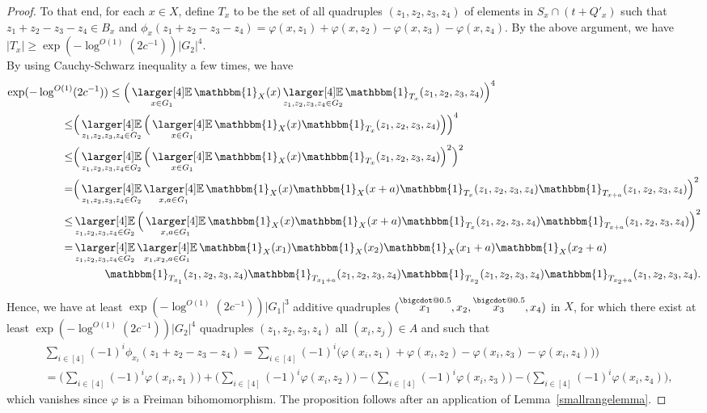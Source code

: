 \documentclass[a4paper,11pt]{article}
\makeatletter
\numberwithin{theorem}{section}
\theoremstyle{definition}
\newcommand\id{\mathbbm{1}}
\newcommand{\exx}{
  \mathop{
    \mathchoice{\vcenter{\hbox{\larger[4]$\mathbb{E}$}}}
               {\kern0pt\mathbb{E}}
               {\kern0pt\mathbb{E}}
               {\kern0pt\mathbb{E}}
  }\displaylimits
}
\newcommand*\bcdot{\mathpalette\bigcdot@{0.5}}
\newcommand*\bigcdot@[2]{\mathbin{\vcenter{\hbox{\scalebox{#2}{$\m@th#1\bullet$}}}}}
\newcommand{\upd}[1]{\overset{\bcdot}{#1}}
\makeatother
\begin{document}
\begin{proof}
    To that end, for each $x \in X$, define $T_x$ to be the set of all quadruples $(z_1, z_2, z_3, z_4)$ of elements in $ S_x \cap (t + Q'_x)$ such that $z_1 + z_2 - z_3 - z_4 \in B_x$ and $\phi_x(z_1 + z_2 - z_3 - z_4) = \varphi(x, z_1) + \varphi(x, z_2) - \varphi(x, z_3) - \varphi(x, z_4)$. By the above argument, we have $|T_x| \geq \exp(-\log^{O(1)} (2c^{-1})) |G_2|^4$.\\
    \indent By using Cauchy-Schwarz inequality a few times, we have
    \begin{align*}\exp(-\log^{O(1)}& (2c^{-1})) \leq \Big(\exx_{x \in G_1} \id_X(x) \exx_{z_1, z_2, z_3, z_4 \in G_2} \id_{T_x}(z_1, z_2, z_3, z_4)\Big)^4 \\
    \leq &\Big( \exx_{z_1, z_2, z_3, z_4 \in G_2} \Big(\exx_{x \in G_1} \id_X(x) \id_{T_x}(z_1, z_2, z_3, z_4)\Big)\Big)^4 \\
    \leq & \Big( \exx_{z_1, z_2, z_3, z_4 \in G_2} \Big(\exx_{x \in G_1} \id_X(x) \id_{T_x}(z_1, z_2, z_3, z_4)\Big)^2\Big)^2\\
    = & \Big( \exx_{z_1, z_2, z_3, z_4 \in G_2}\exx_{x, a \in G_1} \id_X(x)  \id_X(x + a) \id_{T_x}(z_1, z_2, z_3, z_4)\id_{T_{x + a}}(z_1, z_2, z_3, z_4)\Big)^2\\
    \leq & \exx_{z_1, z_2, z_3, z_4 \in G_2}\Big(\exx_{x, a \in G_1} \id_X(x)  \id_X(x + a) \id_{T_x}(z_1, z_2, z_3, z_4)\id_{T_{x + a}}(z_1, z_2, z_3, z_4)\Big)^2\\
    = &\exx_{z_1, z_2, z_3, z_4 \in G_2}\exx_{x_1, x_2, a \in G_1} \id_X(x_1) \id_X(x_2) \id_X(x_1 + a) \id_X(x_2 + a)\\
    &\hspace{1cm}\id_{T_{x_1}}(z_1, z_2, z_3, z_4)\id_{T_{x_1 + a}}(z_1, z_2, z_3, z_4)\id_{T_{x_2}}(z_1, z_2, z_3, z_4)\id_{T_{x_2 + a}}(z_1, z_2, z_3, z_4).\end{align*}
    

    Hence, we have at least $\exp(-\log^{O(1)} (2c^{-1})) |G_1|^3$ additive quadruples $(\upd{x_1}, x_2, \upd{x_3}, x_4)$ in $X$, for which there exist at least $\exp(-\log^{O(1)} (2c^{-1})) |G_2|^4$ quadruples $(z_1, z_2, z_3, z_4)$ all $(x_i, z_j) \in A$ and such that 
    \begin{align*}&\sum_{i \in [4]} (-1)^i \phi_{x_i}(z_1 + z_2 - z_3 - z_4) = \sum_{i \in [4]} (-1)^i \Big(\varphi(x_i, z_1)  + \varphi(x_i, z_2) - \varphi(x_i, z_3) - \varphi(x_i, z_4))\Big)\\
    & = \Big(\sum_{i \in [4]} (-1)^i \varphi(x_i, z_1)\Big) + \Big(\sum_{i \in [4]} (-1)^i \varphi(x_i, z_2)\Big) - \Big(\sum_{i \in [4]} (-1)^i \varphi(x_i, z_3)\Big) -\Big(\sum_{i \in [4]} (-1)^i \varphi(x_i, z_4)\Big),\end{align*}
    which vanishes since $\varphi$ is a Freiman bihomomorphism. The proposition follows after an application of Lemma~\ref{smallrangelemma}.
\end{proof}
\end{document}
